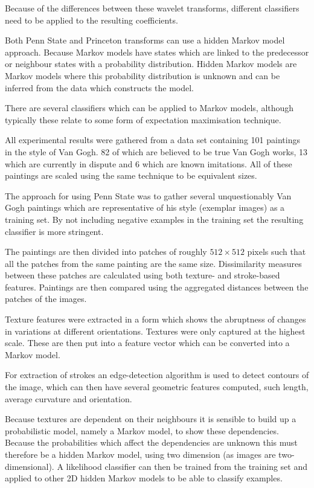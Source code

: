 \documentclass[conference]{IEEEtran}
\begin{document}
Because of the differences between these wavelet transforms, different
classifiers need to be applied to the resulting coefficients.

Both Penn State and Princeton transforms can use a hidden Markov model
approach. Because Markov models have states which are linked to the predecessor
or neighbour states with a probability distribution. Hidden Markov models are
Markov models where this probability distribution is unknown and can be
inferred from the data which constructs the model.

There are several classifiers which can be applied to Markov models, although
typically these relate to some form of expectation maximisation technique.

All experimental results were gathered from a data set containing 101 paintings
in the style of Van Gogh. 82 of which are believed to be true Van Gogh works,
13 which are currently in dispute and 6 which are known imitations. All of
these paintings are scaled using the same technique to be equivalent sizes.

The approach for using Penn State was to gather several unquestionably Van Gogh
paintings which are representative of his style (exemplar images) as a training
set. By not including negative examples in the training set the resulting
classifier is more stringent.

The paintings are then divided into patches of roughly $512 \times 512$ pixels
such that all the patches from the same painting are the same size.
Dissimilarity measures between these patches are calculated using both texture-
and stroke-based features. Paintings are then compared using the aggregated
distances between the patches of the images.

Texture features were extracted in a form which shows the abruptness of changes
in variations at different orientations. Textures were only captured at the
highest scale. These are then put into a feature vector which can be converted
into a Markov model.

For extraction of strokes an edge-detection algorithm is used to detect
contours of the image, which can then have several geometric features computed,
such length, average curvature and orientation.

Because textures are dependent on their neighbours it is sensible to build up a
probabilistic model, namely a Markov model, to show these dependencies. Because
the probabilities which affect the dependencies are unknown this must therefore
be a hidden Markov model, using two dimension (as images are two-dimensional).
A likelihood classifier can then be trained from the training set and applied
to other 2D hidden Markov models to be able to classify examples.
\end{document}
